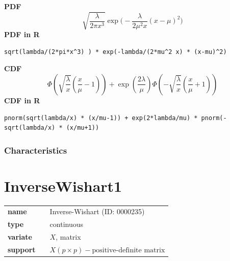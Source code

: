 \smallskip \noindent \hspace{.2cm} \textbf{PDF} 
\begin{equation*}\sqrt{\frac{\lambda}{2\pi x^3}} \exp\Big(-\frac{\lambda}{2\mu^2 x}(x-\mu)^2\Big)\end{equation*}
\smallskip \noindent \hspace{.2cm} \textbf{PDF in R}  
\begin{verbatim}sqrt(lambda/(2*pi*x^3) ) * exp(-lambda/(2*mu^2 x) * (x-mu)^2)\end{verbatim}
\smallskip \noindent \hspace{.2cm} \textbf{CDF} 
\begin{equation*}\Phi\left(\sqrt{\frac{\lambda}{x}} \left(\frac{x}{\mu}-1 \right)\right) +\exp\left(\frac{2 \lambda}{\mu}\right) \Phi\left(-\sqrt{\frac{\lambda}{x}}\left(\frac{x}{\mu}+1 \right)\right)\end{equation*}
\smallskip \noindent \hspace{.2cm} \textbf{CDF in R} 
\begin{verbatim}pnorm(sqrt(lambda/x) * (x/mu-1)) + exp(2*lambda/mu) * pnorm(-sqrt(lambda/x) * (x/mu+1))\end{verbatim}
\smallskip
\subsubsection*{Characteristics}
\smallskip
\section*{InverseWishart1} 

  \bigskip 

\begin{tabular}{p{2cm}cl}
\textbf{name} & & Inverse-Wishart (ID: 0000235)\\ 
 
\textbf{type} & & continuous \\ 

\textbf{variate} & & $X$, matrix \\ 

\textbf{support} & & $X(p \times p) - \text{positive-definite matrix}$
\end{tabular}


